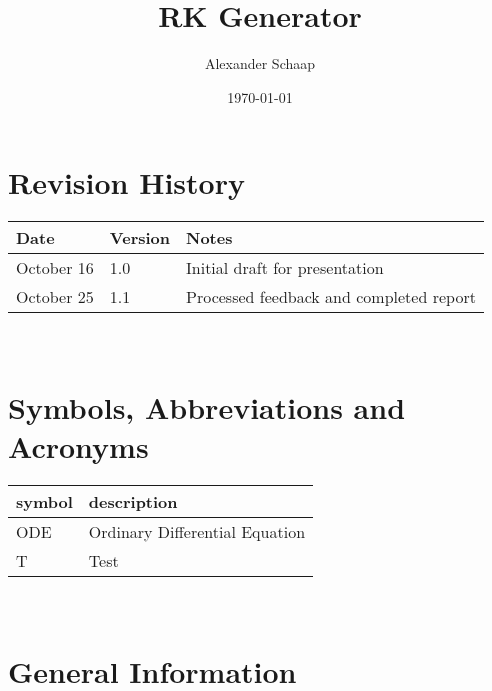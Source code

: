 \documentclass[12pt, titlepage]{article}
\begin{document}
\title{RK Generator} 
\author{Alexander Schaap}
\date{\today}
	
\maketitle


\section{Revision History}

\begin{tabularx}{\textwidth}{p{3cm}p{2cm}X}
\toprule {\bf Date} & {\bf Version} & {\bf Notes}\\
\midrule
October 16 & 1.0 & Initial draft for presentation\\
October 25 & 1.1 & Processed feedback and completed report\\
\bottomrule
\end{tabularx}

~\newpage

\section{Symbols, Abbreviations and Acronyms}

\renewcommand{\arraystretch}{1.2}
\begin{tabular}{l l} 
  \toprule		
  \textbf{symbol} & \textbf{description}\\
  \midrule 
  ODE & Ordinary Differential Equation\\
  T & Test\\
  \bottomrule
\end{tabular}\\


\newpage

\tableofcontents

\listoftables

\listoffigures


\newpage



\section{General Information}
\end{document}
